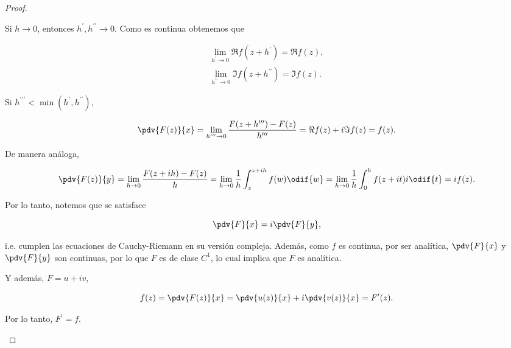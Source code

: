 \documentclass[../main.tex]{subfiles}
\begin{document}
\begin{proof}
\begin{enumerate}[label=""]
            Si \(h\to 0\), entonces \(h^{\prime}, h^{\prime\prime} \to 0\).
            Como es continua
            obtenemos que

            \begin{align*}
                \lim_{h^{\prime} \to 0} \Re f(z + h^{\prime}) = \Re f(z),\\
                \lim_{h^{\prime\prime} \to 0} \Im f(z + h^{\prime\prime}) = \Im f(z).
            \end{align*}

            Si \(h^{\prime\prime\prime} < \min(h^{\prime}, h^{\prime\prime})\),

            \begin{equation*}
                \pdv{F(z)}{x} = \lim_{h^{\prime\prime\prime}\to 0}\dfrac{F(z +
                h^{\prime\prime\prime}) - F(z)}{h^{\prime\prime\prime}} = \Re
                f(z) + i \Im f(z) =
                f(z).
            \end{equation*}

            De manera análoga,

            \begin{equation*}
                \pdv{F(z)}{y} = \lim_{h\to 0}\dfrac{F(z +
                ih) - F(z)}{h} = \lim_{h\to 0}\dfrac{1}{h}\int_{z}^{z +
                ih}f(w)\odif{w} = \lim_{h\to
                0}\dfrac{1}{h}\int_{0}^{h}f(z + it)i\odif{t}= i f(z).
            \end{equation*}

            Por lo tanto, notemos que se satisface

            \begin{equation*}
                \pdv{F}{x} = i \pdv{F}{y},
            \end{equation*}

            i.e. cumplen las ecuaciones de Cauchy-Riemann en su versión compleja.
            Además, como \(f\) es continua, por ser analítica, \(\pdv{F}{x}\) y
            \(\pdv{F}{y}\) son continuas, por lo que \(F\) es de clase \(C^{1}\), lo
            cual implica que \(F\) es analítica.

            Y además, \(F = u + iv\),

            \begin{equation*}
                f(z) = \pdv{F(z)}{x} = \pdv{u(z)}{x} + i \pdv{v(z)}{x} = F^{\prime}(z).
            \end{equation*}

            Por lo tanto, \(F^{\prime} = f\).
    \end{enumerate}
\end{proof}
\end{document}

